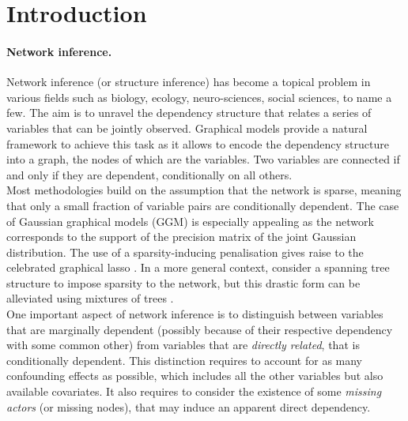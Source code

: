 \section{Introduction} \label{sec:Intro}


\paragraph{Network inference.}
Network inference (or structure inference) has become a topical problem in various fields such as biology, ecology, neuro-sciences, social sciences, to name a few. The aim is to unravel the dependency structure that relates a series of variables that can be jointly observed. Graphical models \citep[see e.g.][]{Lau96} provide a natural framework to achieve this task as it allows to encode the dependency structure into a graph, the nodes of which are the variables. Two variables are connected if and only if they are dependent, conditionally on all others. \\
Most methodologies build on the assumption that the network is sparse, meaning that only a small fraction of variable pairs are conditionally dependent. The case  of Gaussian graphical models (GGM) is especially appealing as the network corresponds to the support of the precision matrix of the joint Gaussian distribution. The use of a sparsity-inducing penalisation gives raise to the celebrated graphical lasso \citep{FHT08}. In a more general context, \cite{ChowLiu} consider a spanning tree structure to impose sparsity to the network, but this drastic form can be alleviated using mixtures of trees \citep{MeilaJaak,kirshner}. \\
One important aspect of network inference is to distinguish between variables that are marginally dependent (possibly because of their respective dependency with some common other) from variables that are {\sl directly related}, that is conditionally dependent. This distinction requires to account for as many confounding effects as possible, which includes all the other variables but also available covariates. It also requires to consider the existence of some {\sl missing actors} (or missing nodes), that may induce an apparent direct dependency.


